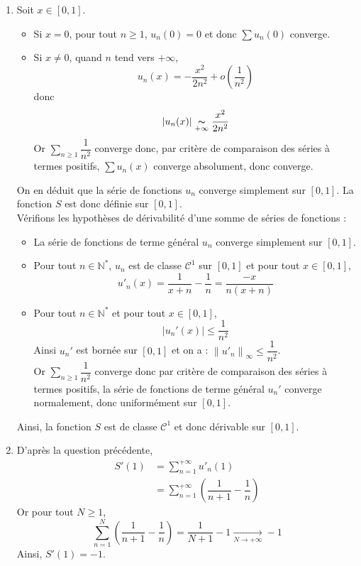 \documentclass[a4paper,10pt]{report}
\begin{document}
\begin{enumerate}
\item Soit $x \in \left[ {0,1} \right]$.
\begin{itemize}
\item Si $x=0$, pour tout $n \geq 1$, $u_n(0)=0$ et donc $\displaystyle\sum u_n(0)$ converge.
\item Si $x\neq 0$, quand $n$ tend vers $ + \infty $, 
$$u_n (x) =  - \dfrac{{x^2 }}{2{n^2 }} + o\left( {\dfrac{1}{{n^2 }}} \right)$$
donc
$$|u_n(x)|\underset{+\infty}{\thicksim}\dfrac{x^2 }{2n^2 }$$
Or  $\displaystyle\sum\limits_{n\geqslant 1}^{}\dfrac{1}{n^2}$ converge
donc, par critère de comparaison des séries à termes positifs, $\displaystyle\sum u_n(x)$ converge absolument, donc converge.
\end{itemize}
On en déduit que la série de fonctions $u_n $ converge simplement sur $\left[ {0,1} \right]$. La fonction $S$ est donc définie sur $\left[ {0,1} \right]$.\\
\medskip
Vérifions les hypothèses de dérivabilité d'une somme de séries de fonctions :
\begin{itemize}
\item La série de fonctions de terme général $u_n$ converge simplement sur $[0,1]$.
\item Pour tout $n \in \mathbb{N}^*$, $u_n $ est de  classe $\mathcal{C}^1 $ sur $\left[ {0,1} \right]$ et pour tout $x \in [0,1]$,
$$u'_n (x) = \dfrac{1}{{x + n}} - \dfrac{1}{n} = \dfrac{{ - x}}{{n(x + n)}}$$
\item Pour tout $n\in\mathbb{N}^*$ et pour tout $x\in\left[ {0,1} \right]$, 
$$|u_n'(x)|\leqslant \dfrac{1}{n^2}$$
Ainsi $u_n'$ est bornée sur $[0,1]$ et on a :
$\left\| {u'_n } \right\|_\infty   \leq \dfrac{1}{{n^2 }}$.\\
Or $\displaystyle\sum\limits_{n\geqslant 1}^{}\dfrac{1}{n^2}$ converge donc par critère de comparaison des séries à termes positifs, la série de fonctions de terme général $u_n'$ converge normalement, donc uniformément sur $\left[ {0,1} \right]$.
\end{itemize}
Ainsi, la fonction $S$ est de classe $\mathcal{C}^1$ et donc dérivable sur $[0,1]$. 
\item D'après la question précédente,
\begin{align*}
S'(1) & = \displaystyle\sum\limits_{n = 1}^{ + \infty } {u'_n (1)} \\
&   =\displaystyle\sum\limits_{n = 1}^{ + \infty } {\left( {\dfrac{1}{{n + 1}} - \dfrac{1}{n}} \right)} 
\end{align*}
Or pour tout $N \geq 1$,
$$\displaystyle\sum\limits_{n = 1}^N {\left( {\dfrac{1}{{n + 1}} - \dfrac{1}{n}} \right)}  = \dfrac{1}{{N + 1}} - 1\xrightarrow[{N \to  + \infty }]{} -1$$
Ainsi, $S'(1) =-1$.
\end{enumerate}
\end{document}

